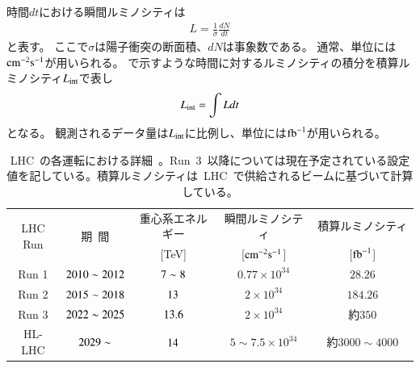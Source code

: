 時間$dt$における瞬間ルミノシティは
\begin{align}
    L = \frac{1}{\sigma}\frac{dN}{dt} \label{eq:lumi}
\end{align}
と表す。
ここで$\sigma$は陽子衝突の断面積、$dN$は事象数である。
通常、単位には$\rm{cm}^{-2}\rm{s}^{-1}$が用いられる。
で示すような時間に対するルミノシティの積分を積算ルミノシティ$L_{\rm{int}}$で表し
\begin{align}
    L_{\rm{int}} = \int{Ldt} \label{eq:ilumi}
\end{align}
となる。
観測されるデータ量は$L_{\rm{int}}$に比例し、単位には$\rm{fb}^{-1}$が用いられる。
\begin{table}[tb]
	\centering
	\begin{tabular}{c|cccc}\hline
	    \multirow{2}{*}{LHC Run} & \multirow{2}{*}{期~間} & 重心系エネルギー & 瞬間ルミノシティ & 積算ルミノシティ　\\ 
	     &  & [TeV] & [$\rm{cm}^{-2}\rm{s}^{-1}$] & [$\rm{fb}^{-1}$]　\\ \hline\hline
		Run 1 & $\rm{2010\sim\rm2012}$ & $\rm{7\sim8}$ & $0.77\times10^{34}$ & $28.26$ \\ \hline
		Run 2 & $\rm{2015\sim2018}$ & $\rm{13}$ & $2\times10^{34}$ & $184.26$ \\ \hline
		Run 3 & $\rm{2022\sim2025}$ & $\rm{13.6}$ & $2\times10^{34}$ & 約$350$ \\\hline
		HL-LHC & $\rm{2029\sim}$ & $\rm{14}$ & $5\sim7.5\times10^{34}$ & 約$3000\sim4000$ \\ \hline
	\end{tabular}
	\caption[LHC の各運転における詳細]{LHC~の各運転における詳細~\cite{URL:18,URL:17}。Run~3~以降については現在予定されている設定値を記している。積算ルミノシティは~LHC~で供給されるビームに基づいて計算している。}
    \label{tb:LHC}
\end{table} 
